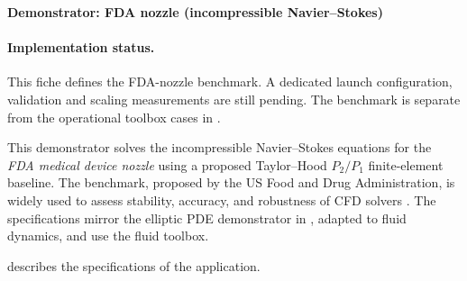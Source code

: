 
\textbf{Demonstrator: FDA nozzle (incompressible Navier--Stokes)}

\label{sec:app:specs:app-feelpp-discr-2}

\paragraph{Implementation status.}
This fiche defines the FDA-nozzle benchmark. A dedicated launch configuration,
validation and scaling measurements are still pending. The benchmark is
separate from the operational toolbox cases in
.

This demonstrator solves the incompressible Navier--Stokes equations for the \emph{FDA medical device nozzle} using a proposed Taylor--Hood $P_2/P_1$ finite-element baseline. The benchmark, proposed by the US Food and Drug Administration, is widely used to assess stability, accuracy, and robustness of CFD solvers \cite{hariharan_multilaboratory_2011,stewart_assessment_2012}. The specifications mirror the elliptic PDE demonstrator in , adapted to fluid dynamics, and use the \Feelpp fluid toolbox.

 describes the specifications of the application.

